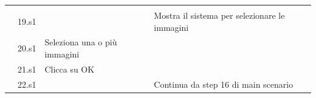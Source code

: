 \begin{longtable}{|C{3.0cm}|C{1.3cm}|L{5.2cm}|L{5.2cm}|}
                        & \\
                        & 19.s1
                        & 
                        & Mostra il sistema per selezionare le immagini\\
                        & 20.s1
                        & Seleziona una o più immagini
                        & \\
                        & 21.s1
                        & Clicca su OK
                        & \\
                        & 22.s1
                        & 
                        & Continua da step 16 di main scenario\\
                \hline
            \end{longtable}

